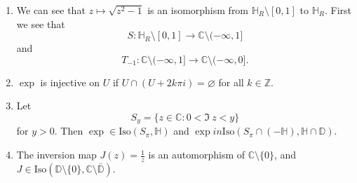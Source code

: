 \begin{xmpl}
\begin{enumerate}
{    }
    \item{
      We can see that $z \mapsto \sqrt{z^2 - 1}$ is an isomorphism
      from $\mathbb{H}_R \setminus [0, 1]$ to $\mathbb{H}_R$.
      First we see that
      $$
          S
      :   \mathbb{H}_R \setminus [0, 1]
      \to \mathbb{C} \setminus (-\infty, 1]
      $$
      and
      $$
          T_{-1}
      :   \mathbb{C} \setminus (-\infty, 1]
      \to \mathbb{C} \setminus (-\infty, 0].
      $$
    }
    \item{
      $\exp$ is injective on $U$ if
      $U \cap (U + 2 k \pi i) = \varnothing$ for all
      $k \in \mathbb{Z}$.
    }
    \item{
      Let
      $$
        S_y
      = \{ z \in \mathbb{C} : 0 < \Im~z < y \}
      $$
      for $y > 0$. Then
      $\exp \in \mathrm{Iso}(S_\pi, \mathbb{H})$
      and
      $\exp in \mathrm{Iso}(S_\pi \cap (-\mathbb{H}), \mathbb{H} \cap
      \mathbb{D})$.
    }
    \item{
      The inversion map $J(z) = \frac{1}{z}$ is an automorphism of
      $\mathbb{C} \setminus \{ 0 \}$, and
      $J \in \mathrm{Iso}(\mathbb{D} \setminus \{ 0 \},
                          \mathbb{C} \setminus \bar{\mathbb{D}})$.
    }
  \end{enumerate}
\end{xmpl}
